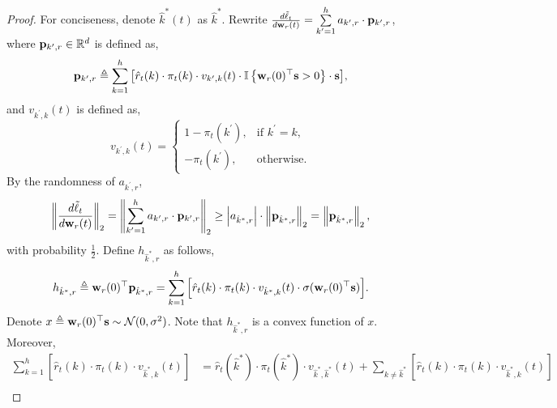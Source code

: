 \begin{proof}
	 For conciseness, denote $\hat{k}^*(t)$ as $\hat{k}^*$. Rewrite $\frac{d\tilde{\ell}_{t}}{d {\mathbf{w}}_r(t)} = \sum\limits_{k^
	\prime=1}^{h}{ a_{k^\prime,r} \cdot {\mathbf{p}}_{k^\prime, r} }$, where ${\mathbf{p}}_{k^\prime, r} \in {\mathbb{R}}^d$ is defined as, 
\begin{equation*}
	{\mathbf{p}}_{k^\prime, r} \triangleq \sum\limits_{k=1}^{h}{ \left[ \hat{r}_{t}(k) \cdot \pi_{t}(k) \cdot v_{k^\prime,k}(t) \cdot {\mathbb{I}}\left\{ {\mathbf{w}}_r(0)^\top {\mathbf{s}} > 0 \right\} \cdot {\mathbf{s}} \right] },
\end{equation*}
and $v_{k^\prime,k}(t)$ is defined as,
\begin{equation*}
	v_{k^\prime,k}(t) = \begin{cases}
    1 - \pi_{t}\left(k^\prime\right), & \text{if $k^\prime = k$}, \\
    - \pi_{t}\left(k^\prime\right), & \text{otherwise}.
  \end{cases}
\end{equation*}
By the randomness of $a_{k^\prime,r}$,
\begin{equation}
\label{eq:gradient_p_lowerbound}
\begin{split}
	\left\| \frac{d\tilde{\ell}_t}{d {\mathbf{w}}_r(t)} \right\|_2 = \left\| \sum\limits_{k^
	\prime=1}^{h}{ a_{k^\prime,r} \cdot {\mathbf{p}}_{k^\prime, r} } \right\|_2 \ge \left| a_{\hat{k}^*,r} \right| \cdot \left\| {\mathbf{p}}_{\hat{k}^*, r}\right\|_2 = \left\| {\mathbf{p}}_{\hat{k}^*, r}\right\|_2,
\end{split}
\end{equation}
with probability $\frac{1}{2}$. Define $h_{\hat{k}^*,r}$ as follows,
\begin{equation}
\label{eq:h_auxiliary}
\begin{split}
	h_{\hat{k}^*,r} \triangleq {\mathbf{w}}_r(0)^\top {\mathbf{p}}_{\hat{k}^*, r} =  \sum\limits_{k=1}^{h}{ \left[ \hat{r}_{t}(k) \cdot \pi_{t}(k) \cdot v_{\hat{k}^*,k}(t) \cdot \sigma( {\mathbf{w}}_r(0)^\top {\mathbf{s}} ) \right] }.
\end{split}
\end{equation}
Denote $x \triangleq {\mathbf{w}}_r(0)^\top {\mathbf{s}} \sim {\mathcal{N}}(0, \sigma^2)$. Note that $h_{\hat{k}^*,r}$ is a convex function of $x$. Moreover,
\begin{equation*}
\begin{split}
	\sum\limits_{k=1}^{h}{ \left[ \hat{r}_{t}(k) \cdot \pi_{t}(k) \cdot v_{\hat{k}^*,k}(t) \right] } &= \hat{r}_{t}(\hat{k}^*) \cdot \pi_{t}(\hat{k}^*) \cdot v_{\hat{k}^*,\hat{k}^*}(t) + \sum\limits_{k\not=\hat{k}^*}{ \left[ \hat{r}_{t}(k) \cdot \pi_{t}(k) \cdot v_{\hat{k}^*,k}(t) \right] } \\

\end{split}
\end{equation*}
\end{proof}
